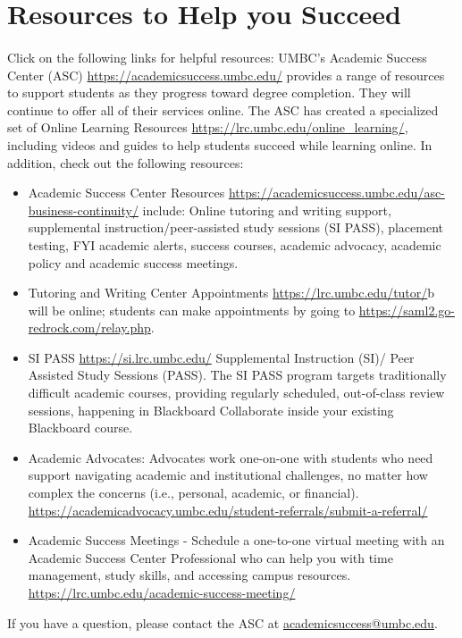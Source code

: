 \documentclass[letter,11pt]{article}
\begin{document}
\section*{Resources to Help you Succeed}
\paragraph{}Click on the following links for helpful resources:
UMBC’s Academic Success Center (ASC) \url{https://academicsuccess.umbc.edu/} provides a range of resources to support students as they progress toward degree completion. They will continue to offer all of their services online. 
The ASC has created a specialized set of Online Learning Resources \url{https://lrc.umbc.edu/online_learning/}, including videos and guides to help students succeed while learning online.
In addition, check out the following resources:
\begin{itemize}
\item Academic Success Center Resources \url{https://academicsuccess.umbc.edu/asc-business-continuity/} include: Online tutoring and writing support, supplemental instruction/peer-assisted study sessions (SI PASS), placement testing, FYI academic alerts, success courses, academic advocacy, academic policy and academic success meetings.
\item Tutoring and Writing Center Appointments \url{https://lrc.umbc.edu/tutor/}b will be online; students can make appointments by going to \url{https://saml2.go-redrock.com/relay.php}.
\item SI PASS \url{https://si.lrc.umbc.edu/} Supplemental Instruction (SI)/ Peer Assisted Study Sessions (PASS). The SI PASS program targets traditionally difficult academic courses, providing regularly scheduled, out-of-class review sessions, happening in Blackboard Collaborate inside your existing Blackboard course.
\item Academic Advocates: Advocates work one-on-one with students who need support navigating academic and institutional challenges, no matter how complex the concerns (i.e., personal, academic, or financial). \url{https://academicadvocacy.umbc.edu/student-referrals/submit-a-referral/}
\item Academic Success Meetings - Schedule a one-to-one virtual meeting with an Academic Success Center Professional who can help you with time management, study skills, and accessing campus resources. \url{https://lrc.umbc.edu/academic-success-meeting/}
\end{itemize}
If you have a question, please contact the ASC at \href{mailto:academicsuccess@umbc.edu}{academicsuccess@umbc.edu}.

\end{document}

